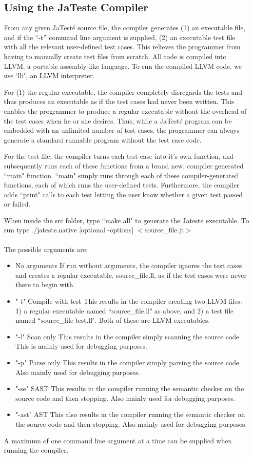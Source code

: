 \documentclass{article}
\begin{document}
\subsection{Using the JaTeste Compiler}
From any given JaTest\'{e} source file, the compiler generates (1) an executable file, and if the ``-t'' command line argument is supplied, (2) an executable test file with all the relevant user-defined test cases. This relieves the programmer from having to manually create test files from scratch. All code is compiled into LLVM, a portable assembly-like language. To run the compiled LLVM code, we use `lli", an LLVM interpreter. 
\par
For (1) the regular executable, the compiler completely disregards the tests and thus produces an executable as if the test cases had never been written. This enables the programmer to produce a regular executable without the overhead of the test cases when he or she desires. Thus, while a JaTest\'{e} program can be embedded with an unlimited number of test cases, the programmer can always generate a standard runnable program without the test case code.
\par
For the test file, the compiler turns each test case into it's own function, and subsequently runs each of these functions from a brand new, compiler generated ``main" function. ``main" simply runs through each of these compiler-generated functions, each of which runs the user-defined tests. Furthermore, the compiler adds ``print" calls to each test letting the user know whether a given test passed or failed.
\par
When inside the src folder, type ``make all" to generate the Jateste executable. To run type ./jateste.native [optional -options] $<$source\_file.jt$>$\\
\\
The possible arguments are:
\begin{itemize}
\item{No arguments}
If run without arguments, the compiler ignores the test cases and creates a regular executable, source\_file.ll, as if the test cases were never there to begin with. 
\item{"-t" Compile with test}
This results in the compiler creating two LLVM files: 1) a regular executable named ``source\_file.ll" as above, and 2) a test file named ``source\_file-test.ll". Both of these are LLVM executables. 
\item{"-l" Scan only}
This results in the compiler simply scanning the source code. This is mainly used for debugging purposes.
\item{"-p" Parse only}
This results in the compiler simply parsing the source code. Also mainly used for debugging purposes.
\item{"-se" SAST}
This results in the compiler running the semantic checker on the source code and then stopping. Also mainly used for debugging purposes.
\item{"-ast" AST}
This also results in the compiler running the semantic checker on the source code and then stopping. Also mainly used for debugging purposes.
\end{itemize}
A maximum of one command line argument at a time can be supplied when running the compiler. 
\end{document}
